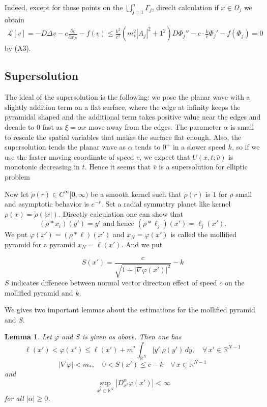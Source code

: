 \documentclass[12pt, a4paper]{article}
\newtheorem{lemma}[thm]{Lemma}
\numberwithin{equation}{section}
\renewcommand{\L}{\mathcal{L}}
\newcommand{\R}{\mathbb{R}}
\newcommand{\pd}[2]{\frac{\partial #1}{\partial #2}}
\begin{document}
\begin{CJK}{UTF8}{bkai}
	Indeed, except for those points on the $\bigcup\limits_{j=1}^n\Gamma_j$, direclt calculation if $x\in\Omega_j$ we obtain
\begin{align*}
	\L[\underline{v}]=-D\Delta\underline{v}-c\pd{\underline{v}}{x_N}-f(\underline{v})\leq \frac{k^2}{c^2}(m_*^2|A_j|^2+1^2)D\Phi_j''-c\cdot\frac{k}{c}\Phi_j'-f(\Phi_j)=0
\end{align*}
by (A3).






\subsection{Supersolution}
	The ideal of the supersolution is the following: we pose the planar wave with a slightly addition term on a flat surface, where the edge at infinity keeps the pyramidal shaped and the additional term takes positive value near the edges and decade to $0$ fast as $\xi=\alpha x$  move away from the edges. The parameter $\alpha$ is small to rescale the spatial variables that makes the surface flat enough. Also, the supersolution tends the planar wave as $\alpha$  tends to $0^+$ in a slower speed $k$, so if we use the faster moving coordinate of speed $c$, we expect that $U(x,t;\bar{v})$ is monotonic decreasing in $t$. Hence it seems that $\bar{v}$ is a supersolution for elliptic problem

	Now let $\tilde{\rho}(r)\in C^\infty[0,\infty)$ be a smooth kernel such that $\tilde{\rho}(r)$ is $1$ for $\rho$ small and asymptotic behavior is $e^{-r}$. Set a radial symmetry planet like kernel $\rho(x)=\tilde{\rho}(|x|)$. Directly calculation one can show that
\[
	(\rho*x_i)(y')=y'\mbox{ and hence }(\rho*\ell_j)(x')=\ell_j(x').
\]
We put $\varphi(x')=(\rho*\ell)(x')$ and $x_N=\varphi(x')$ is called the mollified pyramid for a pyramid $x_N=\ell(x')$. And we put

\begin{equation}\label{iden2.13}
	S(x')=\frac{c}{\sqrt{1+|\nabla\varphi(x')|^2}}-k
\end{equation}
$S$ indicates diffenece between normal vector direction effect of  speed $c$ on the mollified pyramid and $k$. 

We gives two important lemmas about the estimations for the mollified pyramid and $S$.

\begin{lemma}\cite[Lemma 2.2]{KT2011}\label{lem2.4}
	Let $\varphi$ and $S$ is given as above. Then one has
\[
	\ell(x')<\varphi(x')\leq \ell(x')+m^*\int_{\R^N}|y'|\rho(y')\,dy,\quad\forall\,x'\in\R^{N-1}
\]
\[
	|\nabla\varphi|<m_*,\quad 0<S(x')\leq c-k\quad\forall\,x\in\R^{N-1}
\]
and
\[
	\sup_{x'\in\R^N}\left|D^{\alpha}_{x'}\varphi(x')\right|<\infty
\]
for all $|\alpha|\geq 0$.
\end{lemma}


\end{CJK}
\end{document}
